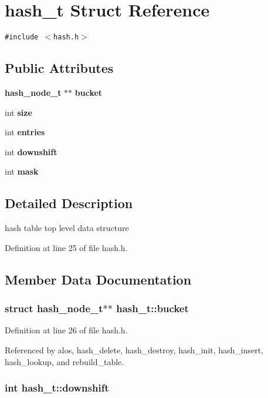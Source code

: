 \section{hash\_\-t  Struct Reference}
\label{structhash__t}
{\tt \#include $<$hash.h$>$}

\subsection*{Public Attributes}
\begin{CompactItemize}
\item 
{\bf hash\_\-node\_\-t} $\ast$$\ast$ {\bf bucket}
\item 
int {\bf size}
\item 
int {\bf entries}
\item 
int {\bf downshift}
\item 
int {\bf mask}
\end{CompactItemize}


\subsection{Detailed Description}
hash table top level data structure 



Definition at line 25 of file hash.h.

\subsection{Member Data Documentation}
\subsubsection{\setlength{\rightskip}{0pt plus 5cm}struct {\bf hash\_\-node\_\-t}$\ast$$\ast$ hash\_\-t::bucket}\label{structhash__t_m0}




Definition at line 26 of file hash.h.

Referenced by alos, hash\_\-delete, hash\_\-destroy, hash\_\-init, hash\_\-insert, hash\_\-lookup, and rebuild\_\-table.
\subsubsection{\setlength{\rightskip}{0pt plus 5cm}int hash\_\-t::downshift}\label{structhash__t_m3}




